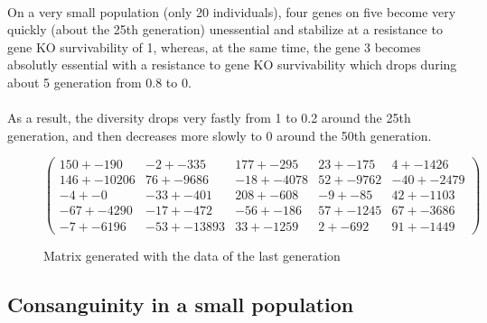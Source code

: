 \documentclass[]{report} %
\begin{document}
    \paragraph*{}
    On a very small population (only 20 individuals), four genes on five become very quickly (about the 25th generation) unessential and stabilize 
    at a resistance to gene KO survivability of 1, whereas, at the same time, the gene 3 becomes absolutly essential 
    with a resistance to gene KO survivability which drops during about 5 generation from 0.8 to 0. 
    \paragraph*{}
    As a result, the diversity drops very fastly from 1 to 0.2 around the 25th generation, and then decreases more slowly to 0 around the 50th generation.
   

    \begin{figure}[H] 
            \centering
            \small
    $
          \begin{pmatrix}
                150 +- 190 & -2 +- 335 & 177 +- 295 & 23 +- 175 & 4 +- 1426 \\
                146 +- 10206 & 76 +- 9686 & -18 +- 4078 & 52 +- 9762 & -40 +- 2479 \\
                -4 +- 0 & -33 +- 401 & 208 +- 608 & -9 +- 85 & 42 +- 1103 \\
                -67 +- 4290 & -17 +- 472 & -56 +- 186 & 57 +- 1245 & 67 +- 3686 \\
                -7 +- 6196 & -53 +- 13893 & 33 +- 1259 & 2 +- 692 & 91 +- 1449 
           \end{pmatrix}
    $
            \caption{\footnotesize Matrix generated with the data of the last generation}
            \label{mat:ps20xg200xmr1-10-4}
    \end{figure}
    
    
    
    \newpage
\subsection{Consanguinity in a small population}
\end{document}
